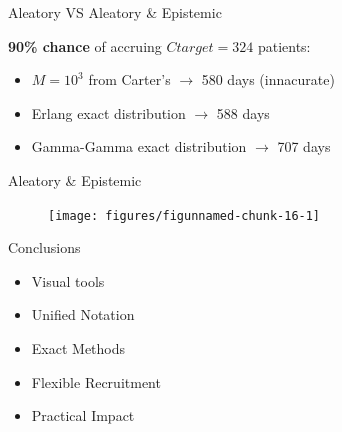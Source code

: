 \documentclass[english]{beamer}\usepackage[]{graphicx}\usepackage[]{xcolor}
\newenvironment{knitrout}{}{} %
\begin{document}
\begin{frame}{Aleatory VS Aleatory \& Epistemic}

\textbf{90\% chance} of accruing $Ctarget=324$ patients: 

\begin{itemize}[label = ]
\item $M=10^3$ from Carter's $\rightarrow$ 580 days (innacurate)
\item Erlang exact distribution $\rightarrow$ 588 days
\item Gamma-Gamma exact distribution $\rightarrow$ 707 days
\end{itemize}
\end{frame}

\begin{frame}{Aleatory \& Epistemic}
\begin{figure}
\begin{knitrout}
\color{fgcolor}
\texttt{[image: figures/figunnamed-chunk-16-1]} 
\end{knitrout}
\end{figure}

\end{frame}

\begin{frame}{Conclusions}

\begin{itemize}[label = ]
\item Visual tools
\item Unified Notation
\item Exact Methods
\item Flexible Recruitment
\item Practical Impact
\end{itemize}
\end{frame}
\end{document}
